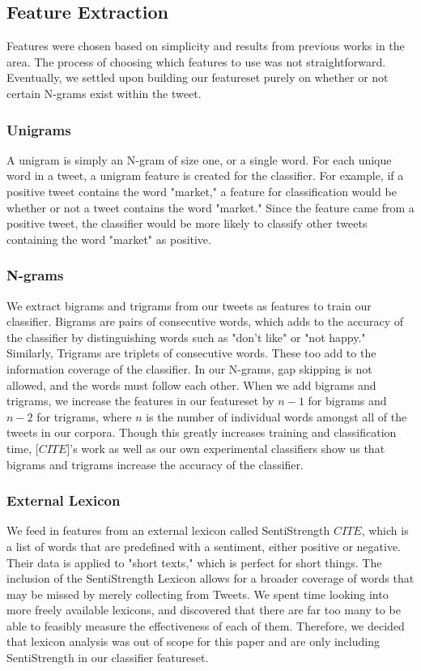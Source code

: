 \documentclass[preprint,pre,floats,aps,amsmath,amssymb,12pt]{revtex4}
\begin{document}
\subsection{Feature Extraction}
Features were chosen based on simplicity and results from previous works in the area. The process of choosing which features to use was not straightforward. Eventually, we settled upon building our featureset purely on whether or not certain N-grams exist within the tweet. 

\subsubsection{Unigrams}
A unigram is simply an N-gram of size one, or a single word. For each unique word in a tweet, a unigram feature is created for the classifier. For example, if a positive tweet contains the word "market," a feature for classification would be whether or not a tweet contains the word "market." Since the feature came from a positive tweet, the classifier would be more likely to classify other tweets containing the word "market" as positive. 

\subsubsection{N-grams}
We extract bigrams and trigrams from our tweets as features to train our classifier. Bigrams are pairs of consecutive words, which adds to the accuracy of the classifier by distinguishing words such as "don't like" or "not happy." Similarly, Trigrams are triplets of consecutive words. These too add to the information coverage of the classifier. In our N-grams, gap skipping is not allowed, and the words must follow each other. When we add bigrams and trigrams, we increase the features in our featureset by $n-1$ for bigrams and $n-2$ for trigrams, where $n$ is the number of individual words amongst all of the tweets in our corpora. Though this greatly increases training and classification time, [$CITE$]'s work as well as our own experimental classifiers show us that bigrams and trigrams increase the accuracy of the classifier. 

\subsubsection{External Lexicon}
We feed in features from an external lexicon called SentiStrength $CITE$, which is a list of words that are predefined with a sentiment, either positive or negative. Their data is applied to "short texts," which is perfect for short things. The inclusion of the SentiStrength Lexicon allows for a broader coverage of words that may be missed by merely collecting from Tweets. We spent time looking into more freely available lexicons, and discovered that there are far too many to be able to feasibly measure the effectiveness of each of them. Therefore, we decided that lexicon analysis was out of scope for this paper and are only including SentiStrength in our classifier featureset. 
\end{document}
